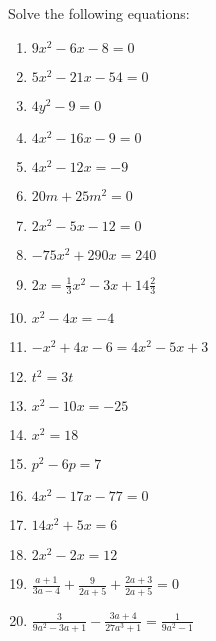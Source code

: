 \begin{exercises}{ }
{
Solve the following equations:
\begin{multicols}{2}
\begin{enumerate}[itemsep=2pt, label=\textbf{\arabic*}. ] 
\item  $9x^{2}-6x-8=0$%
\item  $5x^{2}-21x-54=0$%
\item  $4y^{2}-9=0$%
\item  $4x^{2}-16x-9=0$%
\item  $4x^{2}-12x=-9$%
\item  $20m+25{m}^{2}=0$
\item  $2{x}^{2}-5x-12=0$  
\item  $-75{x}^{2}+290x=240$
\item  $2x=\frac{1}{3}{x}^{2}-3x+14\frac{2}{3}$
\item  ${x}^{2}-4x=-4$      
\item  $-{x}^{2}+4x-6=4{x}^{2}-5x+3$       
\item  ${t}^{2}=3t$  
\item  ${x}^{2}-10x=-25$      
\item  ${x}^{2}=18$
\item  ${p}^{2}-6p=7$
\item  $4{x}^{2}-17x-77=0$
\item  $14{x}^{2}+5x=6$
\item  $2{x}^{2}-2x=12$
\item  $\frac{a+1}{3a-4}+\frac{9}{2a+5}+\frac{2a+3}{2a+5}=0$
\item  $\frac{3}{9a^2-3a+1}-\frac{3a+4}{27a^3+1}=\frac{1}{9a^2-1}$                
\end{enumerate}
\end{multicols}

}
\end{exercises}


